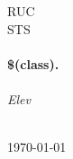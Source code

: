 \begin{titlepage}
  \begin{center}

    \textsc{\LARGE RUC}\\[1.5cm]
    \textsc{\Large STS}\\[0.5cm]

    \HRule\\[0.4cm]
    {\huge \bfseries \$(class).\\[0.4cm]}
    \HRule\\[1.5cm]

    \emph{Elev}\\[0.1cm]
    \noindent{}\\[1cm]

    \vfill

    {\large \today}

  \end{center}
\end{titlepage}
